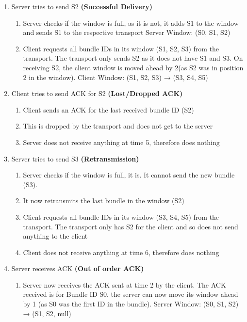 \begin{enumerate} [start=0]
    \item Server tries to send S2 \textbf{(Successful Delivery)}
    \begin{enumerate}
        \item Server checks if the window is full, as it is not, it adds S1 to the window and sends S1 to the respective transport
            \subitem Server Window: (S0, S1, S2)
        \item Client requests all bundle IDs in its window (S1, S2, S3) from the transport. The transport only sends S2 as it does not have S1 and S3. On receiving S2, the client window is moved ahead by 2(as S2 was in position 2 in the window).
            \subitem Client Window: (S1, S2, S3) →  (S3, S4, S5)
    \end{enumerate}
    
    \item Client tries to send ACK for S2 \textbf{(Lost/Dropped ACK)}
    \begin{enumerate}
        \item Client sends an ACK for the last received bundle ID (S2)
        \item This is dropped by the transport and does not get to the server
        \item Server does not receive anything at time 5, therefore does nothing
    \end{enumerate}
    
    \item Server tries to send S3 \textbf{(Retransmission)}
    \begin{enumerate}
        \item Server checks if the window is full, it is. It cannot send the new bundle (S3).
        \item It now retransmits the last bundle in the window (S2)
        \item Client requests all bundle IDs in its window (S3, S4, S5) from the transport. The transport only has S2 for the client and so does not send anything to the client
        \item Client does not receive anything at time 6, therefore does nothing
    \end{enumerate}

    \item Server receives ACK \textbf{(Out of order ACK)}
    \begin{enumerate}
        \item Server now receives the ACK sent at time 2 by the client. The ACK received is for Bundle ID S0, the server can now move its window ahead by 1 (as S0 was the first ID in the bundle).
            \subitem Server Window: (S0, S1, S2) →  (S1, S2, null)
    \end{enumerate}


\end{enumerate}
